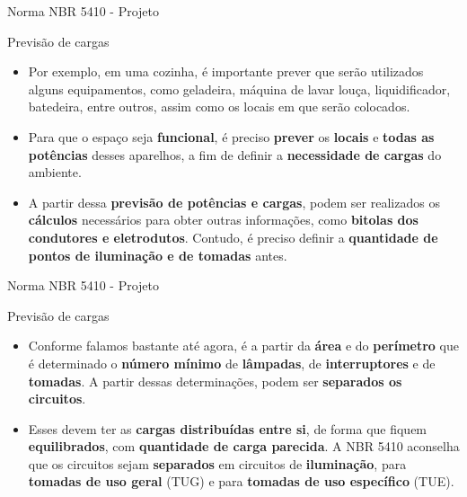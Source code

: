 \begin{frame}{Norma NBR 5410 - Projeto}
	\begin{block}{Previsão de cargas}
		\begin{itemize}
			\item Por exemplo, em uma cozinha, é importante prever que serão utilizados alguns equipamentos, como geladeira, máquina de lavar louça, liquidificador, batedeira, entre outros, assim como os locais em que serão colocados.
			\item Para que o espaço seja \textbf{funcional}, é preciso \textbf{prever} os \textbf{locais} e \textbf{todas as potências} desses aparelhos, a fim de definir a \textbf{necessidade de cargas} do ambiente.
			\item A partir dessa \textbf{previsão de potências e cargas}, podem ser realizados os \textbf{cálculos} necessários para obter outras informações, como \textbf{bitolas dos condutores e eletrodutos}. Contudo, é preciso definir a \textbf{quantidade de pontos de iluminação e de tomadas} antes.
		\end{itemize}
	\end{block}
\end{frame}


\begin{frame}{Norma NBR 5410 - Projeto}
	\begin{block}{Previsão de cargas}
		\begin{itemize}
			\item Conforme falamos bastante até agora, é a partir da \textbf{área} e do \textbf{perímetro} que é determinado o \textbf{número mínimo} de \textbf{lâmpadas}, de \textbf{interruptores} e de \textbf{tomadas}. A partir dessas determinações, podem ser \textbf{separados os circuitos}.
			\item Esses devem ter as \textbf{cargas distribuídas entre si}, de forma que fiquem \textbf{equilibrados}, com \textbf{quantidade de carga parecida}. A NBR 5410 aconselha que os circuitos sejam \textbf{separados} em circuitos de \textbf{iluminação}, para \textbf{tomadas de uso geral} (TUG) e para \textbf{tomadas de uso específico} (TUE).
		\end{itemize}
	\end{block}
\end{frame}


